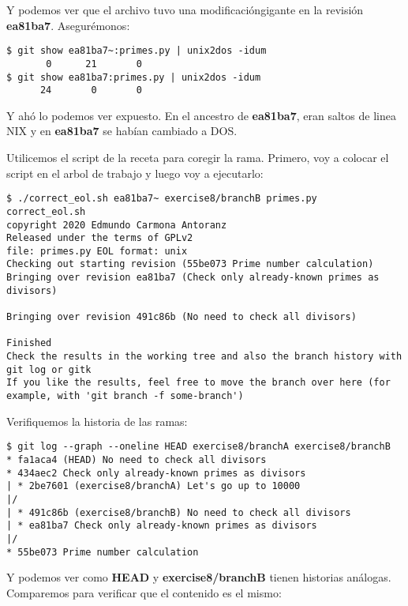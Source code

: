 Y podemos ver que el archivo tuvo una modificacióngigante en la revisión {\bf ea81ba7}. Asegurémonos:

\begin{lstlisting}[style=console_style,
	basicstyle=\small,
	caption={\bf Ejercicio 8} - asegurándonos]
$ git show ea81ba7~:primes.py | unix2dos -idum
       0      21       0
$ git show ea81ba7:primes.py | unix2dos -idum
      24       0       0
\end{lstlisting}

Y ahó lo podemos ver expuesto. En el ancestro de {\bf ea81ba7}, eran saltos de linea NIX y en {\bf ea81ba7} se habían cambiado a DOS.

Utilicemos el script de la receta para coregir la rama. Primero, voy a colocar el script en el arbol de trabajo y luego voy a
ejecutarlo:

\begin{lstlisting}[style=console_style,
	basicstyle=\small,
	caption={\bf Ejercicio 8} - corriendo el script]
$ ./correct_eol.sh ea81ba7~ exercise8/branchB primes.py
correct_eol.sh
copyright 2020 Edmundo Carmona Antoranz
Released under the terms of GPLv2
file: primes.py EOL format: unix
Checking out starting revision (55be073 Prime number calculation)
Bringing over revision ea81ba7 (Check only already-known primes as divisors)

Bringing over revision 491c86b (No need to check all divisors)

Finished
Check the results in the working tree and also the branch history with git log or gitk
If you like the results, feel free to move the branch over here (for example, with 'git branch -f some-branch')
\end{lstlisting}

Verifiquemos la historia de las ramas:

\begin{lstlisting}[style=console_style,
	basicstyle=\small,
	caption={\bf Ejercicio 8} - mirando la historia]
$ git log --graph --oneline HEAD exercise8/branchA exercise8/branchB
* fa1aca4 (HEAD) No need to check all divisors
* 434aec2 Check only already-known primes as divisors
| * 2be7601 (exercise8/branchA) Let's go up to 10000
|/  
| * 491c86b (exercise8/branchB) No need to check all divisors
| * ea81ba7 Check only already-known primes as divisors
|/  
* 55be073 Prime number calculation
\end{lstlisting}

Y podemos ver como {\bf HEAD} y {\bf exercise8/branchB} tienen historias análogas. Comparemos para verificar que el contenido es
el mismo:

